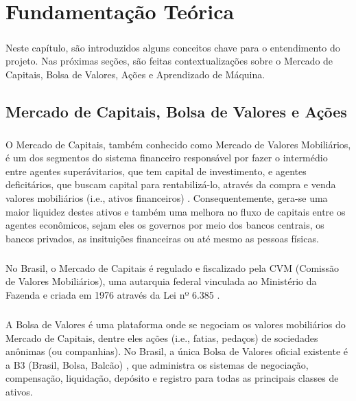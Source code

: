 \chapter{Fundamentação Teórica}
\label{cap2}

\paragraph{} Neste capítulo, são introduzidos alguns conceitos chave para o entendimento do projeto. Nas próximas seções, são feitas contextualizações sobre o Mercado de Capitais, Bolsa de Valores, Ações e Aprendizado de Máquina.


\section{Mercado de Capitais, Bolsa de Valores e Ações}

\paragraph{} O Mercado de Capitais, também conhecido como Mercado de Valores Mobiliários, é um dos segmentos do sistema financeiro responsável por fazer o intermédio entre agentes superávitarios, que tem capital de investimento, e agentes deficitários, que buscam capital para rentabilizá-lo, através da compra e venda valores mobiliários (i.e., ativos financeiros) \cite{mercado_de_capitais}. Consequentemente, gera-se uma maior liquidez destes ativos e também uma melhora no fluxo de capitais entre os agentes econômicos, sejam eles os governos por meio dos bancos centrais, os bancos privados, as insituições financeiras ou até mesmo as pessoas físicas.

\paragraph{} No Brasil, o Mercado de Capitais é regulado e fiscalizado pela CVM (Comissão de Valores Mobiliários), uma autarquia federal vinculada ao Ministério da Fazenda e criada em 1976 através da Lei nº 6.385 \cite{lei_6385}.

\paragraph{} A Bolsa de Valores é uma plataforma onde se negociam os valores mobiliários do Mercado de Capitais, dentre eles ações (i.e., fatias, pedaços) de sociedades anônimas (ou companhias). No Brasil, a única Bolsa de Valores oficial existente é a B3 (Brasil, Bolsa, Balcão) \cite{b3}, que administra os sistemas de negociação, compensação, liquidação, depósito e registro para todas as principais classes de ativos.

